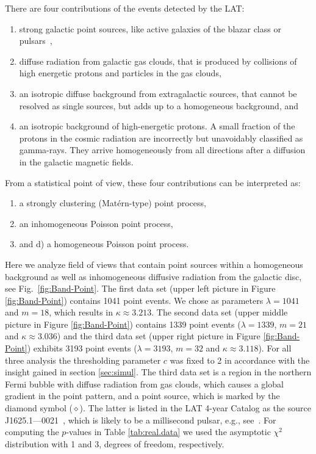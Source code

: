 \documentclass[12pt]{article}
\begin{document}
There are four contributions of the events detected by the LAT:
\begin{enumerate}
  \item strong galactic point sources, like active galaxies of the blazar class or pulsars~\cite{AceroEtAl2015},
  \item diffuse radiation from galactic gas clouds, that is produced by collisions of high energetic protons and particles in the gas clouds,
  \item an isotropic diffuse background from extragalactic sources, that cannot be resolved as single sources, but adds up to a homogeneous background, and
  \item an isotropic background of high-energetic protons. A small fraction of the protons in the cosmic radiation are incorrectly but unavoidably classified as gamma-rays.
    They arrive homogeneously from all directions after a diffusion in the galactic magnetic fields.
\end{enumerate}
From a statistical point of view, these four contributions can be interpreted as:
\begin{enumerate}
  \item a strongly clustering (Mat\'ern-type) point process,
  \item an inhomogeneous Poisson point process,
  \item and d) a homogeneous Poisson point process.
\end{enumerate}
Here we analyze field of views that contain point sources within a homogeneous background as well as inhomogeneous diffusive radiation from the galactic disc,
see Fig.~\ref{fig:Band-Point}.
%
The first data set (upper left picture in Figure \ref{fig:Band-Point}) contains 1041 point events.
We chose as parameters $\lambda=1041$ and $m=18$, which results in $\kappa\approx3.213$.
The second data set (upper middle picture in Figure \ref{fig:Band-Point}) contains 1339 point events ($\lambda=1339$, $m=21$ and $\kappa\approx3.036$) and the third data set (upper right picture in Figure \ref{fig:Band-Point}) exhibits 3193 point events ($\lambda=3193$, $m=32$ and $\kappa\approx3.118$). For all three analysis the thresholding parameter $c$ was fixed to 2 in accordance with the insight gained in section \ref{sec:simul}. The third data set is a region in the northern Fermi bubble with diffuse radiation from gas clouds, which causes a global gradient in the point pattern, and a point source, which is marked by the diamond symbol ($\diamond$). The latter is listed in the LAT 4-year Catalog as the source J1625.1---0021~\cite{AceroEtAl2015}, which is likely to be a millisecond pulsar, e.g., see~\cite{DaiEtAl2016}. For computing the $p$-values in Table \ref{tab:real.data} we used the asymptotic $\chi^2$ distribution with 1 and 3, degrees of freedom, respectively.
\end{document}
